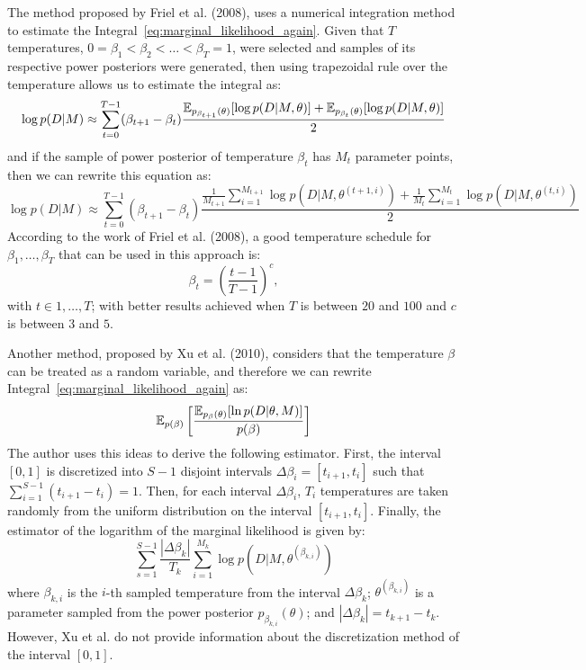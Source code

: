 The method proposed by Friel et al. (2008), uses a numerical integration 
method to estimate the Integral~\ref{eq:marginal_likelihood_again}. 
Given that $T$ temperatures, $0 = \beta_1 < \beta_2 < \ldots < \beta_T = 
1$, were selected and samples of its respective power posteriors were 
generated, then using trapezoidal rule over the temperature allows us to 
estimate the integral as:
\begin{equation*}
    \log{p(D| M)} \approx \sum_{t = 0}^{T - 1} (\beta_{t + 1} - \beta_t)
\frac{
    \mathbb{E}_{p_{\beta_{t + 1}} (\theta)}[\log p(D | M, \theta)]
+ 
    \mathbb{E}_{p_{\beta_{t}} (\theta)}[\log p(D | M, \theta)]}
{2}
\end{equation*}
and if the sample of power posterior of temperature $\beta_t$ has $M_t$
parameter points, then we can rewrite this equation as:
\begin{equation}
\log{p(D| M)} \approx \sum_{t = 0}^{T - 1} (\beta_{t + 1} - \beta_t)
\frac{
    \frac{1}{M_{t + 1}}
    \sum_{i = 1}^{M_{t + 1}}  \log p(D | M, \theta^{(t + 1, i)})
+ 
    \frac{1}{M_t}
    \sum_{i = 1}^{M_t}  \log p(D | M, \theta^{(t, i)})}
{2}
\end{equation}
According to the work of Friel et al. (2008), a good temperature 
schedule for $\beta_1, \ldots, \beta_T$ that can be used in this 
approach is:
\begin{equation*}
    \beta_t = \left(\frac{t - 1}{T - 1}\right)^{c}, 
\end{equation*}
with $t \in {1, \ldots, T}$; with better results achieved when $T$ is
between $20$ and $100$ and $c$ is between $3$ and $5$.

Another method, proposed by Xu et al. (2010), considers that the 
temperature $\beta$ can be treated as a random variable, and therefore 
we can rewrite Integral~\ref{eq:marginal_likelihood_again} as:
\begin{equation}
    \mathbb{E}_{p (\beta)} 
        \left[\frac
            {\mathbb{E}_{p_\beta (\theta)}[\ln p(D|\theta, M)]}
            {p (\beta)}
        \right]
\end{equation}
The author uses this ideas to derive the following estimator. First, 
the interval $[0, 1]$ is discretized into $S - 1$ disjoint intervals 
$\Delta\beta_i = [t_{i + 1}, t_i]$ such that  $\sum_{i = 1}^{S - 1} 
(t_{i + 1} - t_{i}) = 1$. Then, for each interval $\Delta\beta_i$, $T_i$ 
temperatures are taken randomly from the uniform distribution on the 
interval $[t_{i + 1}, t_i]$. Finally, the estimator of the logarithm of
the marginal likelihood is given by:
\begin{equation}
    \sum_{s = 1}^{S - 1}\frac{|\Delta\beta_k|}
                             {T_k}
        \sum_{i = 1}^{M_k} \log p (D | M, \theta^{(\beta_{k, i})})
\end{equation}
where $\beta_{k, i}$ is the $i$-th sampled temperature from the interval
$\Delta\beta_k$; $\theta^{(\beta_{k, i})}$ is a parameter sampled 
from the power posterior $p_{\beta_{k, i}} (\theta)$; and 
$|\Delta\beta_k| = t_{k + 1} - t_k$. However, Xu et al. do not provide
information about the discretization method of the interval $[0, 1]$.


